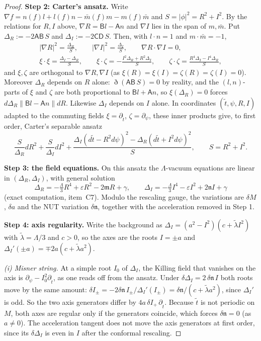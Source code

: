 \documentclass[11pt]{amsart}
\theoremstyle{definition}
\theoremstyle{remark}
\numberwithin{equation}{section}
\begin{document}
\begin{proof}
\smallskip\noindent\textbf{Step 2: Carter's ansatz.} Write $\nabla f=n(f)l+l(f)n-\bar m(f)m-m(f)\bar m$ and $S=|\phi|^2=R^2+I^2$. By the
relations for $R,I$ above, $\nabla R=\mathsf Bl-\mathsf An$ and $\nabla I$ lies in the span of $m,\bar m$. Put $\Delta_R:=-2\mathsf A\mathsf B\,S$ and
$\Delta_I:=-2\mathsf C\mathsf D\,S$. Then, with $l\cdot n=1$ and $m\cdot\bar m=-1$,
\begin{gather*}
|\nabla R|^2=\frac{\Delta_R}{S},\qquad|\nabla I|^2=\frac{\Delta_I}{S},\qquad\nabla R\cdot\nabla I=0,\\
\xi\cdot\xi=\frac{\Delta_I-\Delta_R}{S},\qquad\xi\cdot\zeta=-\frac{I^2\Delta_R+R^2\Delta_I}{S},\qquad
\zeta\cdot\zeta=\frac{R^4\Delta_I-I^4\Delta_R}{S},
\end{gather*}
and $\xi,\zeta$ are orthogonal to $\nabla R,\nabla I$ (as $\xi(R)=\xi(I)=\zeta(R)=\zeta(I)=0$). Moreover $\Delta_R$ depends on
$R$ alone: $\eth(\mathsf A\mathsf B\,S)=0$ by reality, and the $(l,n)$-parts of $\xi$ and $\zeta$ are both proportional to $\mathsf Bl+\mathsf An$, so
$\xi(\Delta_R)=0$ forces $d\Delta_R\parallel \mathsf Bl-\mathsf An\parallel dR$. Likewise $\Delta_I$ depends on $I$ alone. In coordinates
$(\tilde t,\psi,R,I)$ adapted to the commuting fields $\xi=\partial_{\tilde t}$, $\zeta=\partial_\psi$, these inner products give,
to first order, Carter's separable ansatz
\[
\frac{S}{\Delta_R}dR^2+\frac{S}{\Delta_I}dI^2+\frac{\Delta_I(d\tilde t-R^2d\psi)^2-\Delta_R(d\tilde t+I^2d\psi)^2}{S},\qquad S=R^2+I^2.
\]

\smallskip\noindent\textbf{Step 3: the field equations.} On this ansatz the $\Lambda$-vacuum equations are linear in $(\Delta_R,\Delta_I)$,
with general solution
\[
\Delta_R=-\tfrac\Lambda3R^4+\varepsilon R^2-2\mathfrak mR+\gamma,\qquad \Delta_I=-\tfrac\Lambda3I^4-\varepsilon I^2+2\mathfrak nI+\gamma
\]
(exact computation, item~C7). Modulo the rescaling gauge, the variations are $\delta M$, $\delta a$ and the NUT
variation $\delta\mathfrak n$, together with the acceleration removed in Step 1.

\smallskip\noindent\textbf{Step 4: axis regularity.} Write the background as $\Delta_I=(a^2-I^2)(c+\tilde\lambda I^2)$ with
$\tilde\lambda=\Lambda/3$ and $c>0$, so the axes are the roots $I=\pm a$ and $\Delta_I'(\pm a)=\mp2a(c+\tilde\lambda a^2)$.

\emph{(i) Misner string.} At a simple root $I_0$ of $\Delta_I$, the Killing field that vanishes on the axis is
$\partial_\psi-I_0^2\partial_{\tilde t}$, as one reads off from the ansatz. Under $\delta\Delta_I=2\,\delta\mathfrak n\,I$
both roots move by the same amount: $\delta I_\pm=-2\delta\mathfrak n\,I_\pm/\Delta_I'(I_\pm)=\delta\mathfrak n/(c+\tilde\lambda a^2)$,
since $\Delta_I'$ is odd. So the two axis generators differ by $4a\,\delta I_+\,\partial_{\tilde t}$. Because $\tilde t$ is not
periodic on $M$, both axes are regular only if the generators coincide, which forces $\delta\mathfrak n=0$ (as
$a\ne0$). The acceleration tangent does not move the axis generators at first order, since its $\delta\Delta_I$ is even in $I$
after the conformal rescaling.


\end{proof}
\end{document}
